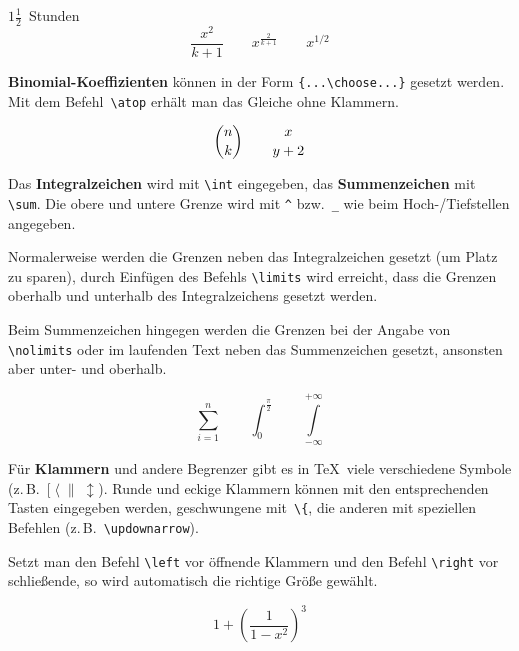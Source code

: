 \begin{LTXexample}
$1\frac{1}{2}$~Stunden
\[
\frac{ x^{2} }{ k+1 } \qquad
x^{ \frac{2}{k+1} } \qquad
x^{ 1/2 }
\]
\end{LTXexample}


\textbf{Binomial-Koeffizienten} können in der Form
\lstinline|{...\choose...}| gesetzt werden.
Mit dem Befehl~\lstinline|\atop| erhält man das Gleiche ohne
Klammern.

\begin{LTXexample}
\[
{ n \choose k } \qquad
{ x\atop y+2 }
\]
\end{LTXexample}


\medskip

Das \textbf{Integralzeichen} wird mit \lstinline|\int| eingegeben, das
\textbf{Summenzeichen} mit \lstinline|\sum|.
Die obere und untere Grenze wird mit \lstinline|^| bzw.~\lstinline|_| wie
beim \mbox{Hoch-}\slash Tiefstellen angegeben.
 
Normalerweise werden die Grenzen neben das Integralzeichen
gesetzt (um Platz zu sparen), durch Einfügen des Befehls
\lstinline|\limits| wird erreicht, dass die Grenzen oberhalb und
unterhalb des Integralzeichens gesetzt werden.
 
Beim Summenzeichen hingegen werden die Grenzen bei der Angabe von
\lstinline|\nolimits| oder im laufenden Text neben das Summenzeichen
gesetzt, ansonsten aber unter- und oberhalb.

\begin{LTXexample}
\[
\sum_{i=1}^{n} \qquad
\int_{0}^{\frac{\pi}{2}} \qquad
\int \limits_{-\infty}^{+\infty}
\]
\end{LTXexample}
 
Für \textbf{Klammern} und andere Begrenzer gibt es in \TeX\ 
viele verschiedene Symbole
(z.\,B.~\([\;\langle\;\|\;\updownarrow\)).
Runde und eckige Klammern können mit den entsprechenden Tasten
eingegeben werden, geschwungene mit~\lstinline|\{|, die anderen mit
speziellen Befehlen (z.\,B.~\lstinline|\updownarrow|).
 
Setzt man den Befehl \lstinline|\left| vor öffnende Klammern und den
Befehl \lstinline|\right| vor schließende, so wird automatisch die
richtige Größe gewählt.

\begin{LTXexample}
\[
1 + \left( \frac{1}{ 1-x^{2} }
    \right) ^3
\]
\end{LTXexample}


